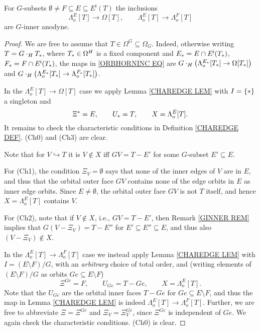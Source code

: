 \documentclass[a4paper,10pt,draft]{article}%
\begin{document}
\begin{proposition}\label{ORB_HORN_PROP}
	For $G$-subsets  
	$\emptyset \neq F \subseteq E \subseteq E^{\mathsf{i}}(T)$
	the inclusions
\begin{equation}\label{ORBHORNINC EQ}
	\Lambda_o^{E}[T] \to \Omega[T],\qquad
	\Lambda_o^{E}[T] \to \Lambda_o^{F}[T]
\end{equation}
	are $G$-inner anodyne.
\end{proposition}


\begin{proof}
We are free to assume that $T \in \Omega^G \subseteq \Omega_G$. Indeed, otherwise writing $T = G \cdot_H T_{\**}$, where $T_{\**} \in \Omega^H$ is a fixed component and 
$E_{\**}=E \cap E^{\mathsf{i}}(T_{\**})$, $F_{\**} = F \cap E^{\mathsf{i}}(T_{\**})$,
the maps in \eqref{ORBHORNINC EQ} are
$G \cdot_H 
\left( \Lambda_o^{E_{\**}}[T_{\**}] \to \Omega[T_{\**}]\right)$
and
$G \cdot_H 
\left( \Lambda_o^{E_{\**}}[T_{\**}] \to \Lambda_o^{F_{\**}}[T_{\**}]\right)$.

In the $\Lambda_o^{E}[T] \to \Omega[T]$ case we apply
Lemma \ref{CHAREDGE LEM} with $I = \{\**\}$ a singleton and
\[
	\Xi^{\**} = E, \qquad 
	U_{\**} = T,\qquad
	X=\Lambda_o^{E}[T].
\]
It remains to check the characteristic conditions in Definition \ref{CHAREDGE DEF}.
	(Ch0) and (Ch3) are clear.

Note that for $V\hookrightarrow T$ it is $V \not \in X$ iff 
$GV = T-E'$ for some $G$-subset
$E' \subseteq E$.

For (Ch1), the condition $\Xi_{V} = \emptyset$
says that none of the inner edges of $V$ are in $E$,
and thus that the orbital outer face $G V$ contains none of the edge orbits in $E$ as inner edge orbits. Since $E \neq \emptyset$, the orbital outer face $GV$ is not $T$ itself, 
and hence $X=\Lambda_o^{E}[T]$ contains $V$.

For (Ch2), note that if $V \not \in X$, i.e., 
$GV = T - E'$, then Remark \ref{GINNER REM} implies that
$G(V-\Xi_V) = T - E''$ for $E'\subseteq E'' \subseteq E$,
and thus also $(V-\Xi_V) \not \in X$.


In the $\Lambda_o^{E}[T] \to \Lambda_o^{F}[T]$ case 
we instead apply Lemma \ref{CHAREDGE LEM} with $I = (E \setminus F)/G$, with an 
\textit{arbitrary} choice of total order, and 
(writing elements of $(E \setminus F)/G$ as orbits $Ge \subseteq E \setminus F$)
\[
	\Xi^{Ge} = F, \qquad 
	U_{G e}= T - Ge, \qquad
	X=\Lambda_o^{E}[T].
\]
Note that the $U_{Ge}$ are the orbital inner faces $T - Ge$ for $Ge \subseteq E \setminus F$, and thus the map
in Lemma \ref{CHAREDGE LEM} is indeed $\Lambda_o^{E}[T] \to \Lambda_o^{F}[T]$.
Further, we are free to abbreviate $\Xi = \Xi^{Ge}$ and $\Xi_V = \Xi^{Ge}_V$, since
$\Xi^{Ge}$ is independent of $G e$.
We again check the characteristic conditions. (Ch0) is clear.


\end{proof}
\end{document}
